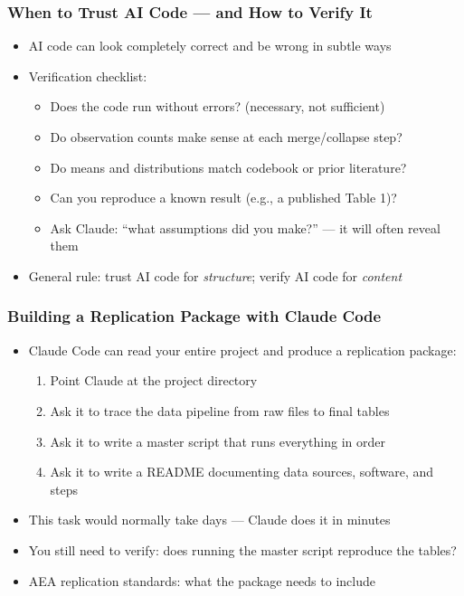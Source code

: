 \documentclass[aspectratio=169, 12pt]{beamer}
\begin{document}
\begin{frame}
\frametitle{When to Trust AI Code --- and How to Verify It}

\begin{itemize}
    \item AI code can look completely correct and be wrong in subtle ways
    \item Verification checklist:
        \begin{itemize}
            \item[$\circ$] Does the code run without errors? (necessary, not sufficient)
            \item[$\circ$] Do observation counts make sense at each merge/collapse step?
            \item[$\circ$] Do means and distributions match codebook or prior literature?
            \item[$\circ$] Can you reproduce a known result (e.g., a published Table 1)?
            \item[$\circ$] Ask Claude: ``what assumptions did you make?'' --- it will often reveal them
        \end{itemize}
    \vspace{.05in}
    \item General rule: trust AI code for \textit{structure}; verify AI code for \textit{content}
\end{itemize}

\end{frame}


\begin{frame}
\frametitle{Building a Replication Package with Claude Code}

\begin{itemize}
    \item Claude Code can read your entire project and produce a replication package:
        \begin{enumerate}
            \item Point Claude at the project directory
            \item Ask it to trace the data pipeline from raw files to final tables
            \item Ask it to write a master script that runs everything in order
            \item Ask it to write a README documenting data sources, software, and steps
        \end{enumerate}
    \item This task would normally take days --- Claude does it in minutes
    \item You still need to verify: does running the master script reproduce the tables?
    \item AEA replication standards: what the package needs to include
\end{itemize}

\end{frame}
\end{document}
